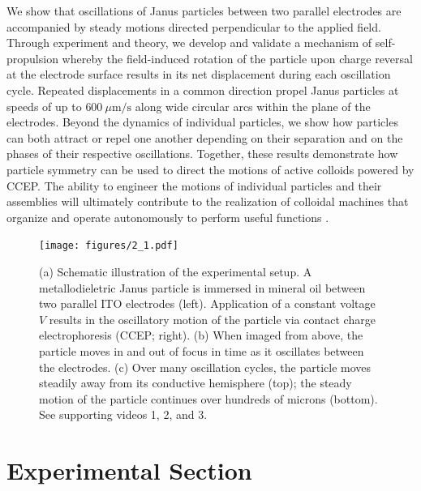 We show that oscillations of Janus particles between two parallel electrodes are accompanied by steady motions directed perpendicular to the applied field.
Through experiment and theory, we develop and validate a mechanism of self-propulsion whereby the field-induced rotation of the particle upon charge reversal at the electrode surface results in its net displacement during each oscillation cycle.
Repeated displacements in a common direction propel Janus particles at speeds of up to $600~\mu\text{m/s}$ along wide circular arcs within the plane of the electrodes.
Beyond the dynamics of individual particles, we show how particles can both attract or repel one another depending on their separation and on the phases of their respective oscillations.
Together, these results demonstrate how particle symmetry can be used to direct the motions of active colloids powered by CCEP.
The ability to engineer the motions of individual particles and their assemblies will ultimately contribute to the realization of colloidal machines that organize and operate autonomously to perform useful functions \cite{Spellings2015}.

\begin{figure}[p]
\centering
\texttt{[image: figures/2\_1.pdf]}
\caption{ (a) Schematic illustration of the experimental setup. A metallodieletric Janus particle is immersed in mineral oil between two parallel ITO electrodes (left).  Application of a constant voltage $V$ results in the oscillatory motion of the particle via contact charge electrophoresis (CCEP; right). (b) When imaged from above, the particle moves in and out of focus in time as it oscillates between the electrodes. (c) Over many oscillation cycles, the particle moves steadily away from its conductive hemisphere (top); the steady motion of the particle continues over hundreds of microns (bottom).  See supporting videos 1, 2, and 3.}
\label{fig:2.1}
\end{figure}
 
 
\section{Experimental Section}

